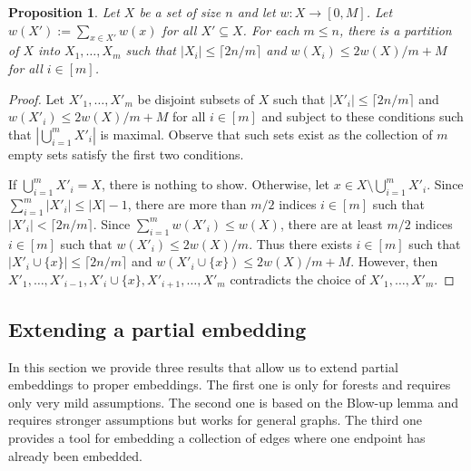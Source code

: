 \documentclass[a4paper, 11pt, reqno]{amsart}
\newtheorem{proposition}[definition]{Proposition}
\numberwithin{equation}{section}
\newcommand{\1}{{\rm 1\hspace*{-0.4ex}%
\rule{0.1ex}{1.52ex}\hspace*{0.2ex}}}
\newcommand{\sm}{\setminus}
\begin{document}
\begin{proposition}\label{prop: weight partition}
Let $X$ be a set of size $n$ and let $w:X\to [0,M]$. 
Let $w(X'):= \sum_{x\in X'}w(x)$ for all $X'\subseteq X$.
For each $m \leq n$, 
there is a partition of $X$ into $X_1,\dots, X_m$ 
such that $|X_i|\leq \lceil2n/m\rceil$ and $w(X_i)\leq 2w(X)/m+ M$ for all $i\in [m]$.
\end{proposition}
\begin{proof}
Let $X'_1,\dots, X'_m$ be disjoint subsets of $X$ such that 
$|X'_i|\leq \lceil 2n/m \rceil$
and $w(X'_i)\leq 2w(X)/m+M$ for all $i\in [m]$ 
and subject to these conditions such that $|\bigcup_{i=1}^{m}X'_i|$ is maximal. 
Observe that such sets exist as the collection of $m$ empty sets satisfy the first two conditions.

If $ \bigcup_{i=1}^{m}X'_i = X$, there is nothing to show. 
Otherwise, let $x\in X\sm \bigcup_{i=1}^{m}X'_i$. 
Since $\sum_{i=1}^{m}|X'_i| \leq |X|-1$, there are more than $m/2$ indices $i\in[m]$ such that $|X'_i|< \lceil2n/m\rceil$. 
Since $\sum_{i=1}^{m}w(X'_i) \leq w(X)$, there are at least $m/2$ indices $i\in[m]$ such that $w(X'_i)\leq 2w(X)/m$.
Thus there exists $i\in[m]$ such that $|X'_i\cup\{x\}|\leq \lceil 2n/m \rceil$ and $w(X'_i\cup\{x\})\leq 2w(X)/m+M$. 
However, then $X'_1,\dots, X'_{i-1}, X'_i\cup\{x\}, X'_{i+1},\dots, X'_m$ contradicts the choice of $X'_1,\dots, X'_m$.
\end{proof}




\subsection{Extending a partial embedding}
\label{sec:2.5}
In this section we provide three results that allow us to extend partial embeddings to proper embeddings.
The first one is only for forests and requires only very mild assumptions.
The second one is based on the Blow-up lemma and requires stronger assumptions but works for general graphs.
The third one provides a tool for embedding a collection of edges where one endpoint has already been embedded.
\end{document}
